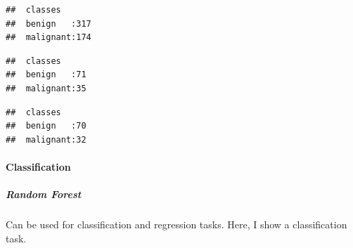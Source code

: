 \documentclass[]{article}
\newenvironment{Shaded}{\begin{snugshade}}{\end{snugshade}}
\newcommand{\KeywordTok}[1]{\textcolor[rgb]{0.13,0.29,0.53}{\textbf{{#1}}}}
\newcommand{\DataTypeTok}[1]{\textcolor[rgb]{0.13,0.29,0.53}{{#1}}}
\newcommand{\OtherTok}[1]{\textcolor[rgb]{0.56,0.35,0.01}{{#1}}}
\newcommand{\NormalTok}[1]{{#1}}
\let\oldparagraph\paragraph
\renewcommand{\paragraph}[1]{\oldparagraph{#1}\mbox{}}
\let\oldsubparagraph\subparagraph
\renewcommand{\subparagraph}[1]{\oldsubparagraph{#1}\mbox{}}
\begin{document}
\begin{Shaded}
\end{Shaded}

\begin{verbatim}
##  classes       
##  benign   :317 
##  malignant:174
\end{verbatim}

\begin{Shaded}
\end{Shaded}

\begin{verbatim}
##  classes      
##  benign   :71 
##  malignant:35
\end{verbatim}

\begin{Shaded}
\end{Shaded}

\begin{verbatim}
##  classes      
##  benign   :70 
##  malignant:32
\end{verbatim}

\paragraph{Classification}\label{classification-1}

\subparagraph{Random Forest}\label{random-forest}

Can be used for classification and regression tasks. Here, I show a
classification task.
\end{document}
